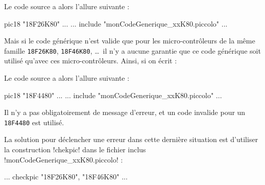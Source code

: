 Le code source a alors l'allure suivante :
\begin{piccolo}
pic18 "18F26K80" ...
  ...
include "monCodeGenerique_xxK80.piccolo"
  ...
\end{piccolo}

Mais si le code générique n'est valide que pour les micro-contrôleurs de la même famille \texttt{18F26K80}, \texttt{18F46K80}, \dots\ il n'y a aucune garantie que ce code générique soit utilisé qu'avec ces micro-contrôleurs. Ainsi, si on écrit :

Le code source a alors l'allure suivante :
\begin{piccolo}
pic18 "18F4480" ...
  ...
include "monCodeGenerique_xxK80.piccolo"
  ...
\end{piccolo}

Il n'y a pas obligatoirement de message d'erreur, et un code invalide pour un \texttt{18F4480} est utilisé.


La solution pour déclencher une erreur dans cette dernière situation est d'utiliser la construction \pic!chekpic! dans le fichier inclus \pic!monCodeGenerique_xxK80.piccolo! :

\begin{piccolo}
  ...
checkpic "18F26K80", "18F46K80"
  ...
\end{piccolo}


 